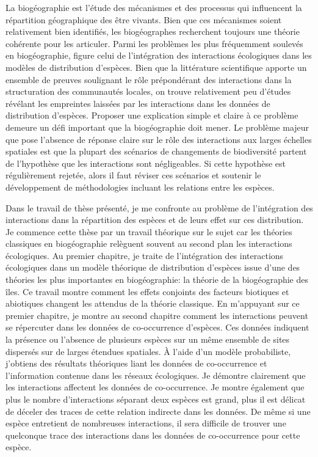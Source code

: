 La biogéographie est l'étude des mécanismes et des processus qui
influencent la répartition géographique des être vivants. Bien que ces
mécanismes soient relativement bien identifiés, les biogéographes
recherchent toujours une théorie cohérente pour les articuler. Parmi les
problèmes les plus fréquemment soulevés en biogéographie, figure celui
de l'intégration des interactions écologiques dans les modèles de
distribution d'espèces. Bien que la littérature scientifique apporte un
ensemble de preuves soulignant le rôle prépondérant des interactions
dans la structuration des communautés locales, on trouve relativement
peu d'études révélant les empreintes laissées par les interactions dans
les données de distribution d'espèces. Proposer une explication simple
et claire à ce problème demeure un défi important que la biogéographie
doit mener. Le problème majeur que pose l'absence de réponse claire sur
le rôle des interactions aux larges échelles spatiales est que la
plupart des scénarios de changements de biodiversité partent de
l'hypothèse que les interactions sont négligeables. Si cette hypothèse
est régulièrement rejetée, alors il faut réviser ces scénarios et
soutenir le développement de méthodologies incluant les relations entre
les espèces.

Dans le travail de thèse présenté, je me confronte au problème de
l'intégration des interactions dans la répartition des espèces et de
leurs effet sur ces distribution. Je commence cette thèse par un travail
théorique sur le sujet car les théories classiques en biogéographie
relèguent souvent au second plan les interactions écologiques. Au
premier chapitre, je traite de l'intégration des interactions
écologiques dans un modèle théorique de distribution d'espèces issue
d'une des théories les plus importantes en biogéographie: la théorie de
la biogéographie des îles. Ce travail montre comment les effets
conjoints des facteurs biotiques et abiotiques changent les attendus de
la théorie classique. En m'appuyant sur ce premier chapitre, je montre
au second chapitre comment les interactions peuvent se répercuter dans
les données de co-occurrence d'espèces. Ces données indiquent la
présence ou l'absence de plusieurs espèces sur un même ensemble de sites
dispersés sur de larges étendues spatiales. À l'aide d'un modèle
probabiliste, j'obtiens des résultats théoriques liant les données de
co-occurrence et l'information contenue dans les réseaux écologiques. Je
démontre clairement que les interactions affectent les données de
co-occurrence. Je montre également que plus le nombre d'interactions
séparant deux espèces est grand, plus il est délicat de déceler des
traces de cette relation indirecte dans les données. De même si une
espèce entretient de nombreuses interactions, il sera difficile de
trouver une quelconque trace des interactions dans les données de
co-occurrence pour cette espèce.

